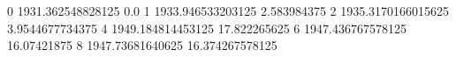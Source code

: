 0 1931.362548828125 0.0
1 1933.946533203125 2.583984375
2 1935.3170166015625 3.9544677734375
4 1949.184814453125 17.822265625
6 1947.436767578125 16.07421875
8 1947.73681640625 16.374267578125
